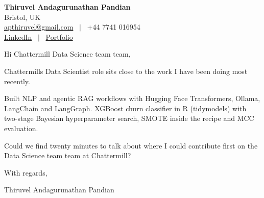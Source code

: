 \documentclass[11pt,a4paper]{article}
\begin{document}
\raggedright
\pagestyle{empty}

\begin{center}
    {\LARGE \color{linkblue} \textbf{Thiruvel Andagurunathan Pandian}}\\[0.2cm]
    Bristol, UK \\
    \href{mailto:apthiruvel@gmail.com}{apthiruvel@gmail.com} \ $|$ \ +44 7741 016954 \\
\href{https://www.linkedin.com/in/thiruvel-a-p/}{LinkedIn} \ $|$ \ \href{https://thiruvel-ap.github.io/PersonalPortfolio/}{Portfolio}
\end{center}

\vspace{0.4cm}

\noindent
Hi Chattermill Data Science team team,

Chattermill\textquotesingle{}s Data Scientist role sits close to the work I have been doing most recently.

Built NLP and agentic RAG workflows with Hugging Face Transformers, Ollama, LangChain and LangGraph. XGBoost churn classifier in R (tidymodels) with two-stage Bayesian hyperparameter search, SMOTE inside the recipe and MCC evaluation.

Could we find twenty minutes to talk about where I could contribute first on the Data Science team team at Chattermill?

\vspace{0.5cm}

With regards,

Thiruvel Andagurunathan Pandian
\end{document}

